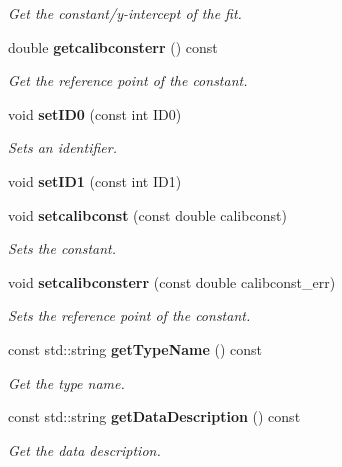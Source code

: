 \begin{DoxyCompactItemize}
\begin{DoxyCompactList}\small\item\em Get the constant/y-\/intercept of the fit. \item\end{DoxyCompactList}\item 
double {\bf getcalibconsterr} () const \label{classCALICE_1_1ScECALOnePeADC_ace16918dad8b849ba42b4679ff027b2e}

\begin{DoxyCompactList}\small\item\em Get the reference point of the constant. \item\end{DoxyCompactList}\item 
void {\bf setID0} (const int ID0)\label{classCALICE_1_1ScECALOnePeADC_a774570476ad12dc6b3d0a7badc14f549}

\begin{DoxyCompactList}\small\item\em Sets an identifier. \item\end{DoxyCompactList}\item 
void {\bfseries setID1} (const int ID1)\label{classCALICE_1_1ScECALOnePeADC_a9bfb79f13a293224f25d5978b26113d3}

\item 
void {\bf setcalibconst} (const double calibconst)\label{classCALICE_1_1ScECALOnePeADC_af725aac44a808a4b26554bcf3bd02d8d}

\begin{DoxyCompactList}\small\item\em Sets the constant. \item\end{DoxyCompactList}\item 
void {\bf setcalibconsterr} (const double calibconst\_\-err)\label{classCALICE_1_1ScECALOnePeADC_a2600303815a54840929c50845983d020}

\begin{DoxyCompactList}\small\item\em Sets the reference point of the constant. \item\end{DoxyCompactList}\item 
const std::string {\bf getTypeName} () const 
\begin{DoxyCompactList}\small\item\em Get the type name. \item\end{DoxyCompactList}\item 
const std::string {\bf getDataDescription} () const 
\begin{DoxyCompactList}\small\item\em Get the data description. \item\end{DoxyCompactList}\end{DoxyCompactItemize}


